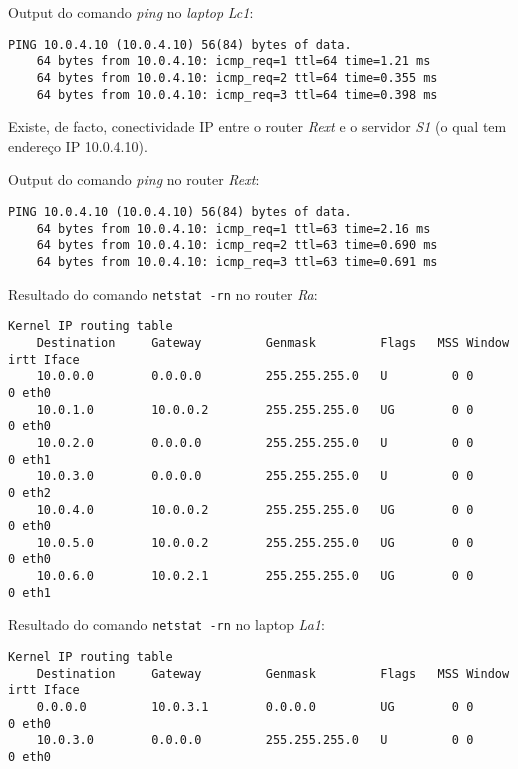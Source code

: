 Output do comando \emph{ping} no \emph{laptop} \emph{Lc1}:

\begin{Verbatim}[fontsize=\scriptsize]
    PING 10.0.4.10 (10.0.4.10) 56(84) bytes of data.
    64 bytes from 10.0.4.10: icmp_req=1 ttl=64 time=1.21 ms
    64 bytes from 10.0.4.10: icmp_req=2 ttl=64 time=0.355 ms
    64 bytes from 10.0.4.10: icmp_req=3 ttl=64 time=0.398 ms
\end{Verbatim}


Existe, de facto, conectividade IP entre o router \emph{Rext} e o servidor
\emph{S1} (o qual tem endereço IP 10.0.4.10).

Output do comando \emph{ping} no router \emph{Rext}:

\begin{Verbatim}[fontsize=\scriptsize]
    PING 10.0.4.10 (10.0.4.10) 56(84) bytes of data.
    64 bytes from 10.0.4.10: icmp_req=1 ttl=63 time=2.16 ms
    64 bytes from 10.0.4.10: icmp_req=2 ttl=63 time=0.690 ms
    64 bytes from 10.0.4.10: icmp_req=3 ttl=63 time=0.691 ms
\end{Verbatim}


Resultado do comando \texttt{netstat -rn} no router \emph{Ra}:

\begin{Verbatim}[fontsize=\scriptsize]
    Kernel IP routing table
    Destination     Gateway         Genmask         Flags   MSS Window  irtt Iface
    10.0.0.0        0.0.0.0         255.255.255.0   U         0 0          0 eth0
    10.0.1.0        10.0.0.2        255.255.255.0   UG        0 0          0 eth0
    10.0.2.0        0.0.0.0         255.255.255.0   U         0 0          0 eth1
    10.0.3.0        0.0.0.0         255.255.255.0   U         0 0          0 eth2
    10.0.4.0        10.0.0.2        255.255.255.0   UG        0 0          0 eth0
    10.0.5.0        10.0.0.2        255.255.255.0   UG        0 0          0 eth0
    10.0.6.0        10.0.2.1        255.255.255.0   UG        0 0          0 eth1
\end{Verbatim}

Resultado do comando \texttt{netstat -rn} no laptop \emph{La1}:

\begin{Verbatim}[fontsize=\scriptsize]
    Kernel IP routing table
    Destination     Gateway         Genmask         Flags   MSS Window  irtt Iface
    0.0.0.0         10.0.3.1        0.0.0.0         UG        0 0          0 eth0
    10.0.3.0        0.0.0.0         255.255.255.0   U         0 0          0 eth0
\end{Verbatim}

